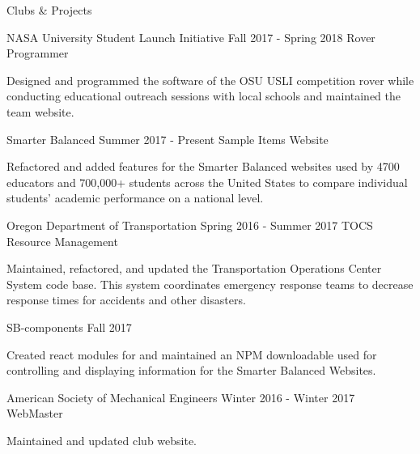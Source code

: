 \documentclass{resume} %
\begin{document}

\begin{rSection}{Clubs \& Projects}
  
    
  \begin{rSubsection} {NASA University Student Launch Initiative} {Fall 2017 - Spring 2018} {Rover Programmer} {}
  \item Designed and programmed the software of the OSU USLI competition rover while conducting educational outreach sessions with local schools and maintained the team website.
  \end{rSubsection}

  \begin{rSubsection} {Smarter Balanced} {Summer 2017 - Present} {Sample Items Website} {}
  \item Refactored and added features for the Smarter Balanced websites used by 4700 educators and 700,000+ students across the United States to compare individual students' academic performance on a national level.
  \end{rSubsection}

  \begin{rSubsection} {Oregon Department of Transportation} {Spring 2016 - Summer 2017} {TOCS Resource Management} {}
  \item Maintained, refactored, and updated the Transportation Operations Center System code base. This system coordinates emergency response teams to decrease response times for accidents and other disasters.
  \end{rSubsection}

  \begin{rSubsection} {SB-components} {Fall 2017} {} {}
  \item Created react modules for and maintained an NPM downloadable used for controlling and displaying information for the Smarter Balanced Websites.
  \end{rSubsection}

  \begin{rSubsection} {American Society of Mechanical Engineers} {Winter 2016 - Winter 2017} {WebMaster} {}
  \item Maintained and updated club website.
  \end{rSubsection}

\end{rSection}
\end{document}
